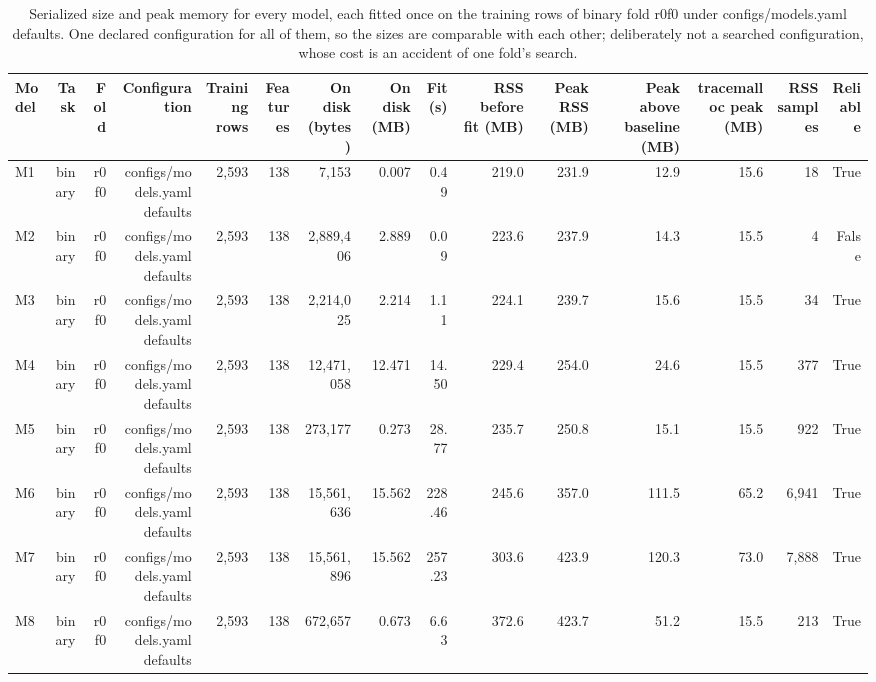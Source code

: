 \begin{table}[htbp]
  \centering
  \caption{Serialized size and peak memory for every model, each fitted once on the training rows of binary fold r0f0 under configs/models.yaml defaults. One declared configuration for all of them, so the sizes are comparable with each other; deliberately not a searched configuration, whose cost is an accident of one fold's search.}
  \label{tab:t26}
  \begin{tabular}{lrrrrrrrrrrrrrr}
    \toprule
    Model & Task & Fold & Configuration & Training rows & Features & On disk (bytes) & On disk (MB) & Fit (s) & RSS before fit (MB) & Peak RSS (MB) & Peak above baseline (MB) & tracemalloc peak (MB) & RSS samples & Reliable \\
    \midrule
    M1 & binary & r0f0 & configs/models.yaml defaults & 2,593 & 138 & 7,153 & 0.007 & 0.49 & 219.0 & 231.9 & 12.9 & 15.6 & 18 & True \\
    M2 & binary & r0f0 & configs/models.yaml defaults & 2,593 & 138 & 2,889,406 & 2.889 & 0.09 & 223.6 & 237.9 & 14.3 & 15.5 & 4 & False \\
    M3 & binary & r0f0 & configs/models.yaml defaults & 2,593 & 138 & 2,214,025 & 2.214 & 1.11 & 224.1 & 239.7 & 15.6 & 15.5 & 34 & True \\
    M4 & binary & r0f0 & configs/models.yaml defaults & 2,593 & 138 & 12,471,058 & 12.471 & 14.50 & 229.4 & 254.0 & 24.6 & 15.5 & 377 & True \\
    M5 & binary & r0f0 & configs/models.yaml defaults & 2,593 & 138 & 273,177 & 0.273 & 28.77 & 235.7 & 250.8 & 15.1 & 15.5 & 922 & True \\
    M6 & binary & r0f0 & configs/models.yaml defaults & 2,593 & 138 & 15,561,636 & 15.562 & 228.46 & 245.6 & 357.0 & 111.5 & 65.2 & 6,941 & True \\
    M7 & binary & r0f0 & configs/models.yaml defaults & 2,593 & 138 & 15,561,896 & 15.562 & 257.23 & 303.6 & 423.9 & 120.3 & 73.0 & 7,888 & True \\
    M8 & binary & r0f0 & configs/models.yaml defaults & 2,593 & 138 & 672,657 & 0.673 & 6.63 & 372.6 & 423.7 & 51.2 & 15.5 & 213 & True \\

\end{tabular}
\end{table}

